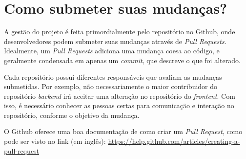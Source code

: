 \section{Como submeter suas mudanças?}
\label{cap:como-submeter-suas-mudancas}

 A gestão do projeto é feita primordialmente pelo repositório no Github, onde
 desenvolvedores podem submeter suas mudanças através de \textit{Pull Requests}.
 Idealmente, um \textit{Pull Requests} adiciona uma mudança coesa ao código, e
 geralmente condensada em apenas um \textit{commit}, que descreve o que foi
 alterado.

 Cada repositório possui diferentes responsáveis que avaliam as mudanças submetidas.
 Por exemplo, não necessariamente o maior contribuidor do repositório \textit{backend}
 irá aceitar uma alteração no repositório do \textit{frontent}. Com isso, é necessário
 conhecer as pessoas certas para comunicação e interação no repositório, conforme
 o objetivo da mudança.

 O Github oferece uma boa documentação de como criar um \textit{Pull Request},
 como pode ser visto no link (em inglês): \url{https://help.github.com/articles/creating-a-pull-request}
